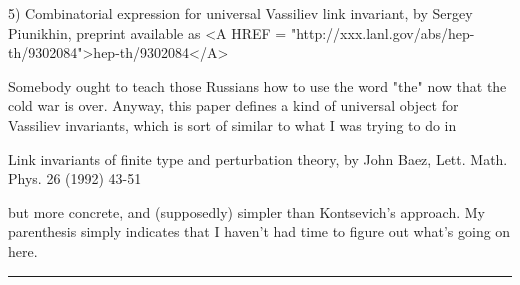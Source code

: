 5)  Combinatorial expression for universal Vassiliev link invariant, by
Sergey Piunikhin, preprint available as <A HREF = "http://xxx.lanl.gov/abs/hep-th/9302084">hep-th/9302084</A>

Somebody ought to teach those Russians how to use the word "the" now
that the cold war is over.  Anyway, this paper defines a kind of
universal object for Vassiliev invariants, which is sort of similar to what I
was trying to do in 

Link invariants of finite type and perturbation theory, by John Baez,
Lett. Math. Phys. 26 (1992) 43-51

but more concrete, and (supposedly) simpler than Kontsevich's approach.
My parenthesis simply indicates that I haven't had time to figure out
what's going on here.
\par\noindent\rule{\textwidth}{0.4pt}

